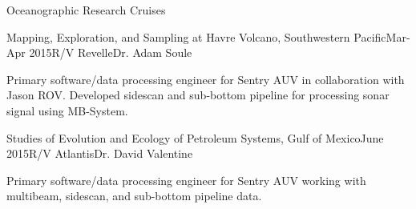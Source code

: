 \documentclass{resume} %
\begin{document}
\begin{rSection}{Oceanographic Research Cruises}
\begin{rSubsection}{Mapping, Exploration, and Sampling at Havre Volcano, Southwestern Pacific}{Mar-Apr 2015}{R/V Revelle}{Dr. Adam Soule}
\item{Primary software/data processing engineer for Sentry AUV in collaboration with Jason ROV. Developed sidescan and sub-bottom pipeline for processing sonar signal using MB-System.}
\end{rSubsection}


\begin{rSubsection}{Studies of Evolution and Ecology of Petroleum Systems, Gulf of Mexico}{June 2015}{R/V Atlantis}{Dr. David Valentine}
\item{Primary software/data processing engineer for Sentry AUV working with multibeam, sidescan, and sub-bottom pipeline data.}
\end{rSubsection}
\end{rSection}




%
%
%
%
%
%
\end{document}
